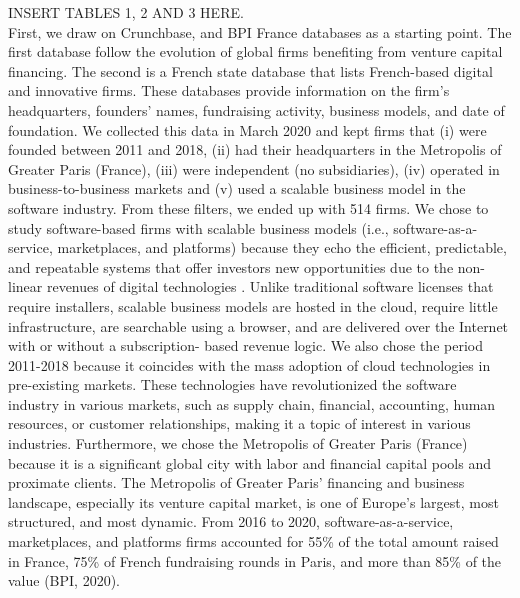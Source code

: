 \documentclass[12pt]{article}
\begin{document}
INSERT TABLES 1, 2 AND 3 HERE. \\

First, we draw on Crunchbase, and BPI France databases as a starting point. The first database follow the evolution of global firms benefiting from venture capital financing. The second is a French state database that lists French-based digital and innovative firms. These databases provide information on the firm’s headquarters, founders’ names, fundraising activity, business models, and date of foundation. We collected this data in March 2020 and kept firms that (i) were founded between 2011 and 2018, (ii) had their headquarters in the Metropolis of Greater Paris (France), (iii) were independent (no subsidiaries), (iv) operated in business-to-business markets and (v) used a scalable business model in the software industry. From these filters, we ended up with 514 firms. We chose to study software-based firms with scalable business models (i.e., software-as-a-service, marketplaces, and platforms) because they echo the efficient, predictable, and repeatable systems that offer investors new opportunities due to the non-linear revenues of digital technologies \citep{nambisan2017digital}. Unlike traditional software licenses that require installers, scalable business models are hosted in the cloud, require little infrastructure, are searchable using a browser, and are delivered over the Internet with or without a subscription- based revenue logic. We also chose the period 2011-2018 because it coincides with the mass adoption of cloud technologies in pre-existing markets. These technologies have revolutionized the software industry in various markets, such as supply chain, financial, accounting, human resources, or customer relationships, making it a topic of interest in various industries. Furthermore, we chose the Metropolis of Greater Paris (France) because it is a significant global city with labor and financial capital pools and proximate clients. The Metropolis of Greater Paris’ financing and business landscape, especially its venture capital market, is one of Europe’s largest, most structured, and most dynamic. From 2016 to 2020, software-as-a-service, marketplaces, and platforms firms accounted for 55\% of the total amount raised in France, 75\% of French fundraising rounds in Paris, and more than 85\% of the value (BPI, 2020).
\end{document}
